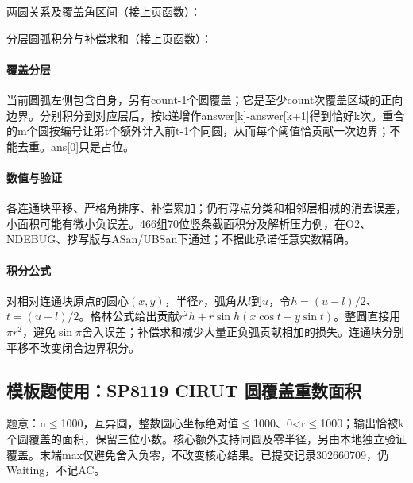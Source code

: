 \Needspace{479pt}



\newpage

两圆关系及覆盖角区间（接上页函数）：



\newpage

分层圆弧积分与补偿求和（接上页函数）：



\newpage

\paragraph{覆盖分层} 当前圆弧左侧包含自身，另有count-1个圆覆盖；它是至少count次覆盖区域的正向边界。分别积分到对应层后，按k递增作answer[k]-answer[k+1]得到恰好k次。重合的m个圆按编号让第t个额外计入前t-1个同圆，从而每个阈值恰贡献一次边界；不能去重。ans[0]只是占位。

\paragraph{数值与验证} 各连通块平移、严格角排序、补偿累加；仍有浮点分类和相邻层相减的消去误差，小面积可能有微小负误差。466组70位竖条截面积分及解析压力例，在O2、NDEBUG、抄写版与ASan/UBSan下通过；不据此承诺任意实数精确。

\paragraph{积分公式} 对相对连通块原点的圆心$(x,y)$，半径$r$，弧角从$l$到$u$，令$h=(u-l)/2$、$t=(u+l)/2$。格林公式给出贡献$r^2h+r\sin h(x\cos t+y\sin t)$。整圆直接用$\pi r^2$，避免$\sin\pi$舍入误差；补偿求和减少大量正负弧贡献相加的损失。连通块分别平移不改变闭合边界积分。

\Needspace{337pt}

\subsection*{模板题使用：SP8119 CIRUT 圆覆盖重数面积}

\label{usage-example-417}

题意：n$\le$1000，互异圆，整数圆心坐标绝对值$\le$1000、0<r$\le$1000；输出恰被k个圆覆盖的面积，保留三位小数。核心额外支持同圆及零半径，另由本地独立验证覆盖。末端max仅避免舍入负零，不改变核心结果。已提交记录302660709，仍Waiting，不记AC。


